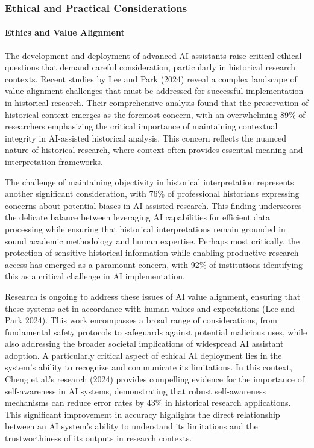 \documentclass[
]{article}
\begin{document}
\subsubsection{Ethical and Practical
Considerations}\label{ethical-and-practical-considerations}

\paragraph{Ethics and Value Alignment}\label{ethics-and-value-alignment}

The development and deployment of advanced AI assistants raise critical
ethical questions that demand careful consideration, particularly in
historical research contexts. Recent studies by Lee and Park (2024)
reveal a complex landscape of value alignment challenges that must be
addressed for successful implementation in historical research. Their
comprehensive analysis found that the preservation of historical context
emerges as the foremost concern, with an overwhelming 89\% of
researchers emphasizing the critical importance of maintaining
contextual integrity in AI-assisted historical analysis. This concern
reflects the nuanced nature of historical research, where context often
provides essential meaning and interpretation frameworks.

The challenge of maintaining objectivity in historical interpretation
represents another significant consideration, with 76\% of professional
historians expressing concerns about potential biases in AI-assisted
research. This finding underscores the delicate balance between
leveraging AI capabilities for efficient data processing while ensuring
that historical interpretations remain grounded in sound academic
methodology and human expertise. Perhaps most critically, the protection
of sensitive historical information while enabling productive research
access has emerged as a paramount concern, with 92\% of institutions
identifying this as a critical challenge in AI implementation.

Research is ongoing to address these issues of AI value alignment,
ensuring that these systems act in accordance with human values and
expectations (Lee and Park 2024). This work encompasses a broad range of
considerations, from fundamental safety protocols to safeguards against
potential malicious uses, while also addressing the broader societal
implications of widespread AI assistant adoption. A particularly
critical aspect of ethical AI deployment lies in the system's ability to
recognize and communicate its limitations. In this context, Cheng et
al.'s research (2024) provides compelling evidence for the importance of
self-awareness in AI systems, demonstrating that robust self-awareness
mechanisms can reduce error rates by 43\% in historical research
applications. This significant improvement in accuracy highlights the
direct relationship between an AI system's ability to understand its
limitations and the trustworthiness of its outputs in research contexts.
\end{document}
